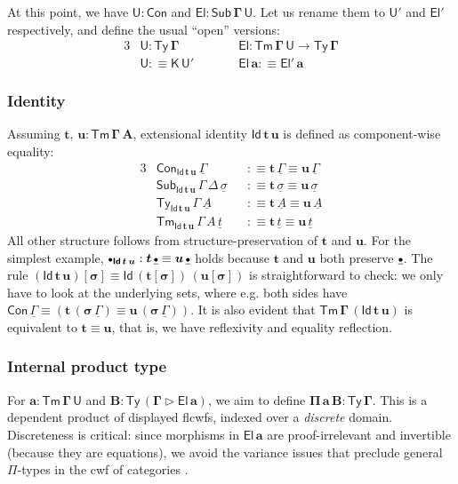 \documentclass[12pt,a4paper,twoside,openany]{book}
\theoremstyle{remark}
\theoremstyle{definition}
\theoremstyle{theorem}
\newcommand{\bs}[1]{\boldsymbol{#1}}
\newcommand{\Con}{\mathsf{Con}}
\newcommand{\Sub}{\mathsf{Sub}}
\newcommand{\Tm}{\mathsf{Tm}}
\newcommand{\Ty}{\mathsf{Ty}}
\newcommand{\U}{\mathsf{U}}
\newcommand{\El}{\mathsf{El}}
\newcommand{\Id}{\mathsf{Id}}
\newcommand{\ext}{\triangleright}
\newcommand{\emptycon}{\scaleobj{.75}\bullet}
\newcommand{\K}{\mathsf{K}}
\newcommand{\bsigma}{\bs{\sigma}}
\newcommand{\bt}{\bs{t}}
\newcommand{\bu}{\bs{u}}
\newcommand{\ba}{\bs{a}}
\newcommand{\bU}{\bs{\U}}
\newcommand{\bEl}{\bs{\El}}
\newcommand{\ul}[1]{\underline{#1}}
\newcommand{\ulGamma}{\ul{\Gamma}}
\newcommand{\ulsigma}{\ul{\sigma}}
\newcommand{\ulemptycon}{\ul{\emptycon}}
\newcommand{\ult}{\ul{t}}
\newcommand{\ulA}{\ul{A}}
\newcommand{\defn}{:\equiv}
\begin{document}
At this point, we have $\bs{\U : \Con}$ and $\bs{\El : \Sub\,\Gamma\,\U}$. Let us
rename them to $\bU'$ and $\bEl'$ respectively, and define the usual ``open''
versions:
\begin{alignat*}{3}
  &\bs{\U} : \bs{\Ty\,\Gamma} &&\bs{\El} : \bs{\Tm\,\Gamma\,\U} \to \bs{\Ty\,\Gamma}\\
  &\bs{\U} \defn \bs{\K\,\U'}\hspace{2em}&&\bs{\El}\,\ba \defn \bEl'\,\ba
\end{alignat*}

\subsubsection{Identity}

Assuming $\bs{t,\,u : \Tm\,\Gamma\,A}$, extensional identity $\bs{\Id\,t\,u}$ is
defined as component-wise equality:
\begin{alignat*}{3}
  & \Con_{\bs{\Id\,t\,u}}\,\ulGamma &&\defn \bt\,\ulGamma \equiv \bu\,\ulGamma\\
  & \Sub_{\bs{\Id\,t\,u}}\,\Gamma\,\Delta\,\ulsigma &&\defn \bt\,\ulsigma \equiv \bu\,\ulsigma\\
  & \Ty_{\bs{\Id\,t\,u}}\,\Gamma\,\ulA &&\defn \bt\,\ulA \equiv \bu\,\ulA\\
  & \Tm_{\bs{\Id\,t\,u}}\,\Gamma\,A\,\ult &&\defn \bt\,\ult \equiv \bu\,\ult
\end{alignat*}
All other structure follows from structure-preservation of $\bt$ and $\bu$. For
the simplest example, $\emptycon_{\bs{\Id\,t\,u}} : \bt\,\ulemptycon \equiv
\bu\,\ulemptycon$ holds because $\bt$ and $\bu$ both preserve $\ulemptycon$. The
rule $\bs{(\Id\,t\,u)[\sigma]} \equiv \bs{\Id\,(t[\sigma])\,(u[\sigma])}$ is
straightforward to check: we only have to look at the underlying sets, where
e.g. both sides have $\Con\,\ulGamma \equiv (\bt\,(\bsigma\,\ulGamma) \equiv
\bu\,(\bsigma\,\ulGamma))$. It is also evident that
$\bs{\Tm\,\Gamma\,(\Id\,t\,u)}$ is equivalent to $\bt \equiv \bu$, that is, we
have reflexivity and equality reflection.

\subsubsection{Internal product type}

For $\bs{a : \Tm\,\Gamma\,\U}$ and $\bs{B : \Ty\,(\Gamma \ext \El\,a)}$, we aim
to define $\bs{\Pi\,a\,B : \Ty\,\Gamma}$. This is a dependent product of displayed
flcwfs, indexed over a \emph{discrete} domain. Discreteness is critical: since
morphisms in $\bs{\El\,a}$ are proof-irrelevant and invertible (because they are
equations), we avoid the variance issues that preclude general $\Pi$-types in
the cwf of categories \cite[Secion~A1.5]{johnstone2002sketches}.
\end{document}
